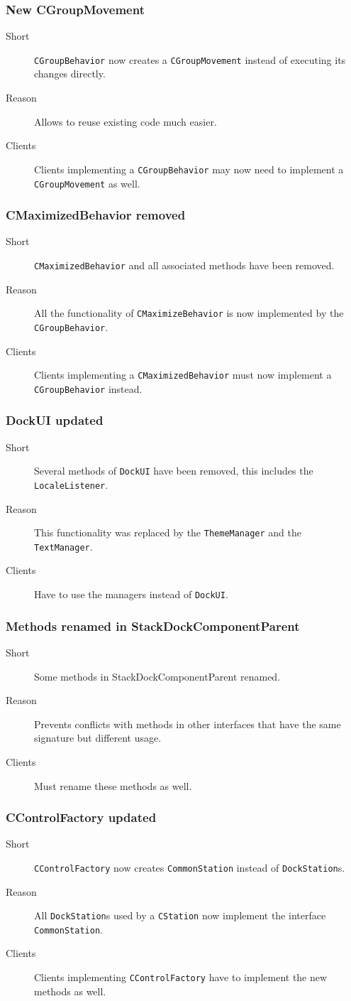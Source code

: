 \documentclass[a4paper,10pt]{article}
\newcommand{\src}[1]{\lstinline[basicstyle=\normalsize\ttfamily,keywordstyle=\normalsize\ttfamily,identifierstyle=\normalsize\ttfamily]|#1|}
\newcommand{\short}{\item[Short]}
\newcommand{\why}{\item[Reason]}
\newcommand{\clients}{\item[Clients]}
\begin{document}
\subsubsection{New CGroupMovement}
\begin{description}
 \short \src{CGroupBehavior} now creates a \src{CGroupMovement} instead of executing its changes directly.
 \why Allows to reuse existing code much easier.
 \clients Clients implementing a \src{CGroupBehavior} may now need to implement a \src{CGroupMovement} as well.
\end{description}

\subsubsection{CMaximizedBehavior removed}
\begin{description}
 \short \src{CMaximizedBehavior} and all associated methods have been removed.
 \why All the functionality of \src{CMaximizeBehavior} is now implemented by the \src{CGroupBehavior}.
 \clients Clients implementing a \src{CMaximizedBehavior} must now implement a \src{CGroupBehavior} instead.
\end{description}

\subsubsection{DockUI updated}
\begin{description}
 \short Several methods of \src{DockUI} have been removed, this includes the \linebreak \src{LocaleListener}.
 \why This functionality was replaced by the \src{ThemeManager} and the \linebreak \src{TextManager}.
 \clients Have to use the managers instead of \src{DockUI}.
\end{description}

\subsubsection{Methods renamed in StackDockComponentParent}
\begin{description}
 \short Some methods in StackDockComponentParent renamed.
 \why Prevents conflicts with methods in other interfaces that have the same signature but different usage.
 \clients Must rename these methods as well.
\end{description}

\subsubsection{CControlFactory updated}
\begin{description}
 \short \src{CControlFactory} now creates \src{CommonStation} instead of \src{DockStation}s.
 \why All \src{DockStation}s used by a \src{CStation} now implement the interface \src{CommonStation}.
 \clients Clients implementing \src{CControlFactory} have to implement the new methods as well.
\end{description}
\end{document}
